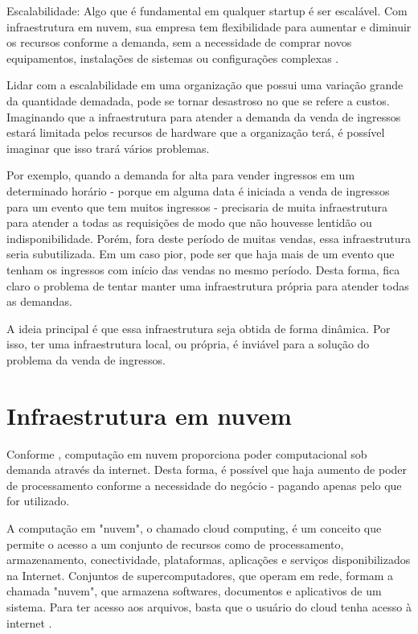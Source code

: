 \begin{citacao}
Escalabilidade: Algo que é fundamental em qualquer startup é ser escalável.
Com infraestrutura em nuvem, sua empresa tem flexibilidade para aumentar e
diminuir os recursos conforme a demanda, sem a necessidade de comprar novos equipamentos, 
instalações de sistemas ou configurações complexas 
\cite{beneficios-da-computacao-em-nuvem-para-sua-startup}.

\end{citacao}

Lidar com a escalabilidade em uma organização que possui uma variação grande da quantidade
demadada, pode se tornar desastroso no que se refere a custos. Imaginando
que a infraestrutura para atender a demanda da venda de ingressos estará limitada
pelos recursos de hardware que a organização terá, é possível imaginar que isso trará
vários problemas.

Por exemplo, quando a demanda for alta para vender ingressos em um determinado horário - 
porque em alguma data é iniciada a venda de ingressos para um evento que tem muitos ingressos
- precisaria de muita infraestrutura para atender a todas as requisições de modo que não houvesse
lentidão ou indisponibilidade. Porém, fora deste período de muitas vendas, essa
infraestrutura seria subutilizada. Em um caso pior, pode ser que haja mais de um evento que
tenham os ingressos com início das vendas no mesmo período. Desta forma, fica claro o problema
de tentar manter uma infraestrutura própria para atender todas as demandas.

A ideia principal é que essa infraestrutura seja obtida de forma dinâmica. Por isso,
ter uma infraestrutura local, ou própria, é inviável para a solução do problema da
venda de ingressos.

\section{Infraestrutura em nuvem}\label{infraestrutura-em-nuvem}

Conforme \cite{what-is-cloud-computing}, computação em nuvem proporciona poder computacional
sob demanda através da internet. Desta forma, é possível que haja aumento de poder
de processamento conforme a necessidade do negócio - pagando apenas pelo que for utilizado.

\begin{citacao}
A computação em "nuvem", o chamado cloud computing, é um conceito que permite o acesso a
um conjunto de recursos como de processamento, armazenamento, conectividade, plataformas,
aplicações e serviços disponibilizados na Internet. Conjuntos de supercomputadores, que operam em
rede, formam a chamada "nuvem", que armazena softwares, documentos e aplicativos de um sistema.
Para ter acesso aos arquivos, basta que o usuário do cloud tenha acesso à internet
\cite{cloud-computing-conceitos-e-perspectivas-2012}.
\end{citacao}


